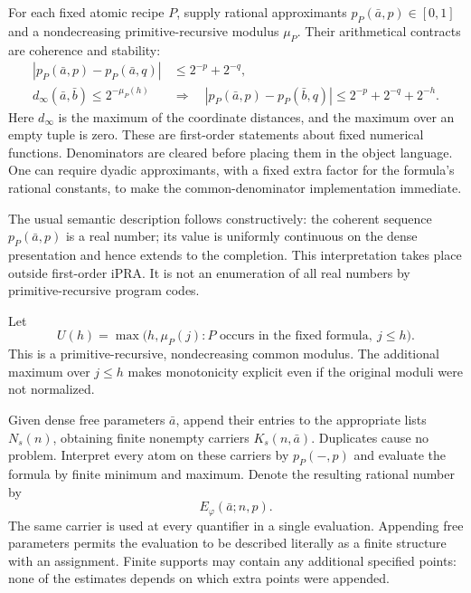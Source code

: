 For each fixed atomic recipe $P$, supply rational approximants
$p_P(\bar a,p)\in[0,1]$ and a nondecreasing primitive-recursive
modulus $\mu_P$. Their arithmetical contracts are coherence and stability:
\begin{equation}
\begin{split}
 |p_P(\bar a,p)-p_P(\bar a,q)|
   &\leq 2^{-p}+2^{-q},\\
 d_\infty(\bar a,\bar b)\leq2^{-\mu_P(h)}
 \quad&\Longrightarrow\quad
 |p_P(\bar a,p)-p_P(\bar b,q)|
   \leq2^{-p}+2^{-q}+2^{-h}.
\end{split}
\label{eq:cm-atom-contract}
\end{equation}
Here $d_\infty$ is the maximum of the coordinate distances, and the
maximum over an empty tuple is zero. These are first-order statements
about fixed numerical functions. Denominators are cleared before
placing them in the object language. One can require dyadic
approximants, with a fixed extra factor for the formula's rational
constants, to make the common-denominator implementation immediate.

The usual semantic description follows constructively: the coherent
sequence $p_P(\bar a,p)$ is a real number; its value is uniformly
continuous on the dense presentation and hence extends to the
completion. This interpretation takes place outside first-order iPRA.
It is not an enumeration of all real numbers by primitive-recursive
program codes.

Let
\begin{equation}
 U(h)=\max\bigl(h,\mu_P(j):
       P\text{ occurs in the fixed formula},\ j\leq h\bigr).
 \label{eq:cm-common-modulus}
\end{equation}
This is a primitive-recursive, nondecreasing common modulus. The
additional maximum over $j\leq h$ makes monotonicity explicit even if
the original moduli were not normalized.

Given dense free parameters $\bar a$, append their entries to the
appropriate lists $N_s(n)$, obtaining finite nonempty carriers
$K_s(n,\bar a)$. Duplicates cause no problem. Interpret every atom
on these carriers by $p_P(-,p)$ and evaluate the formula by finite
minimum and maximum. Denote the resulting rational number by
\begin{equation}
 E_\varphi(\bar a;n,p).
 \label{eq:cm-evaluator}
\end{equation}
The same carrier is used at every quantifier in a single evaluation.
Appending free parameters permits the evaluation to be described
literally as a finite structure with an assignment. Finite supports
may contain any additional specified points: none of the estimates
depends on which extra points were appended.

